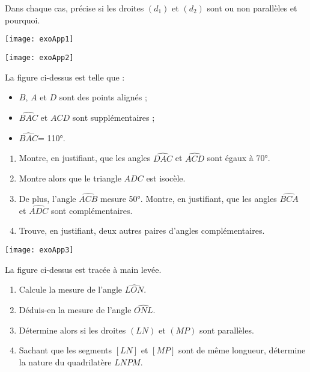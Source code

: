\begin{exercice}
Dans chaque cas, précise si les droites $(d_1)$ et $(d_2)$ sont ou non parallèles et pourquoi.

\begin{center}
    \texttt{[image: exoApp1]}
\end{center}

\end{exercice}



\begin{exercice}

\begin{center}
    \texttt{[image: exoApp2]}
\end{center}

La figure ci-dessus est telle que :
\begin{itemize}
    \item $B$, $A$ et $D$ sont des points alignés ;
    \item $\widehat{BAC}$ et $\widehat{ACD}$ sont supplémentaires ;
    \item $\widehat{BAC}$= 110°.
\end{itemize}

\begin{enumerate}
\item Montre, en justifiant, que les angles $\widehat{DAC}$ et $\widehat{ACD}$ sont égaux à 70°.
\item Montre alors que le triangle $ADC$ est isocèle.
\item De plus, l'angle $\widehat{ACB}$ mesure 50°. Montre, en justifiant, que les angles $\widehat{BCA}$ et $\widehat{ADC}$ sont complémentaires.
\item Trouve, en justifiant, deux autres paires d'angles complémentaires.
\end{enumerate}
\end{exercice}




\begin{exercice}

\begin{center}
    \texttt{[image: exoApp3]}
\end{center}

La figure ci-dessus est tracée à main levée.

\begin{enumerate}
\item Calcule la mesure de l'angle $\widehat{LON}$.
\item Déduis-en la mesure de l'angle $\widehat{ONL}$.
\item Détermine alors si les droites $(LN)$ et $(MP)$ sont parallèles.
\item Sachant que les segments $[LN]$ et $[MP]$ sont de même longueur, détermine la nature du quadrilatère $LNPM$.
\end{enumerate}
\end{exercice}




